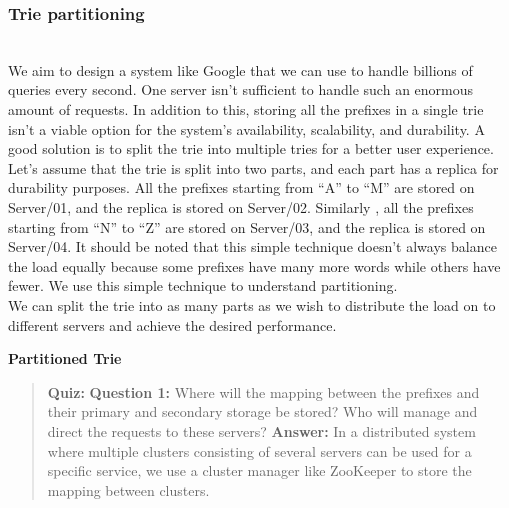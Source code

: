 \subsubsection{Trie partitioning}\label{xzrFqzQF_HWG07T9uFEgO}
\\
We aim to design a system like Google that we can use to handle billions of queries every second. One server isn't sufficient to handle such an enormous amount of requests. In addition to this, storing all the prefixes in a single trie isn't a viable option for the system's availability, scalability, and durability. A good solution is to split the trie into multiple tries for a better user experience.
\\
Let's assume that the trie is split into two parts, and each part has a replica for durability purposes. All the prefixes starting from ``A'' to ``M'' are stored on Server/01, and the replica is stored on Server/02. Similarly , all the prefixes starting from ``N'' to ``Z'' are stored on Server/03, and the replica is stored on Server/04. It should be noted that this simple technique doesn't always balance the load equally because some prefixes have many more words while others have fewer. We use this simple technique to understand partitioning.
\\
We can split the trie into as many parts as we wish to distribute the load on to different servers and achieve the desired performance.

\textbf{Partitioned Trie}

\begin{table}[htbp]
\centering
\small
{}
\caption{Partitioned Trie}
\end{table}

\begin{quote}
\textbf{Quiz:}
\textbf{Question 1:} Where will the mapping between the prefixes and their primary and secondary storage be stored? Who will manage and direct the requests to these servers?
\textbf{Answer:} In a distributed system where multiple clusters consisting of several servers can be used for a specific service, we use a cluster manager like ZooKeeper to store the mapping between clusters.
\end{quote}

